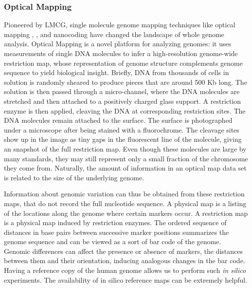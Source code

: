 \subsubsection*{Optical Mapping}
Pioneered by LMCG, single molecule genome mapping techniques like optical mapping \cite{Schwartz_etal_1993_Science}, \cite{Dimalanta_etal_2004_AnalChem}, and nanocoding \cite{Jo_etal_2007_PNAS} have changed the landscape of whole genome analysis. Optical Mapping is a novel platform for analyzing genomes: it uses measurements of single DNA molecules to infer a high-resolution genome-wide restriction map, whose representation of genome structure complements genome sequence to yield biological insight. Briefly, DNA from thousands of cells in solution is randomly sheared to produce pieces that are around 500 Kb long. The solution is then passed through a micro-channel, where the DNA molecules are stretched and then attached to a positively charged glass support. A restriction enzyme is then applied, cleaving the DNA at corresponding restriction sites. The DNA molecules remain attached to the surface. The surface is photographed under a microscope after being stained with a fluorochrome. The cleavage sites show up in the image as tiny gaps in the fluorescent line of the molecule, giving an snapshot of the full restriction map. Even though these molecules are large by many standards, they may still represent only a small fraction of the chromosome they come from. Naturally, the amount of information in an optical map data set is related to the size of the underlying genome. 

Information about genomic variation can thus be obtained from these restriction maps, that do not record the full nucleotide sequence. A physical map is a listing of the locations along the genome where certain markers occur. A restriction map is a physical map induced by restriction enzymes. The ordered sequence of distances in base pairs between successive marker positions summarizes the genome sequence and can be viewed as a sort of bar code of the genome. Genomic differences can affect the presence or absence of markers, the distances between them and their orientation, inducing analogous changes in the bar code. Having a reference copy of the human genome allows us to perform such {\emph{in silico}} experiments. The availability of in silico reference maps can be extremely helpful.

